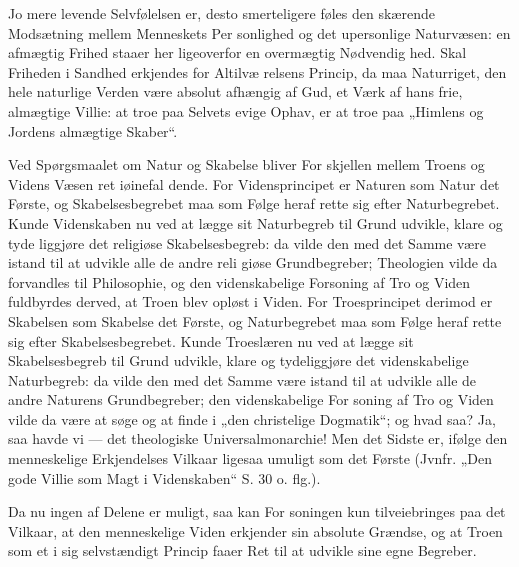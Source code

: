 \documentclass[12pt]{book}
\newcommand{\opage}[1]{\marginnote{\footnotesize\textit{[#1]}}}
\begin{document}
Jo mere levende Selvfølelsen er, desto smerteligere
føles den skærende Modsætning mellem Menneskets Per\-%
sonlighed og det upersonlige Naturvæsen: en afmægtig
Frihed staaer her ligeoverfor en overmægtig Nødvendig\-%
hed. Skal Friheden i Sandhed erkjendes for Altilvæ\-%
relsens Princip, da maa Naturriget, den hele naturlige
Verden være absolut afhængig af Gud, et Værk af hans
frie, almægtige Villie: at troe paa Selvets evige Ophav,
er at troe paa „Himlens og Jordens almægtige Skaber“.

Ved Spørgsmaalet om Natur og Skabelse bliver For\-%
skjellen mellem Troens og Videns Væsen ret iøinefal\-%
dende. For Vidensprincipet er Naturen som Natur det
Første, og Skabelsesbegrebet maa som Følge heraf rette
sig efter Naturbegrebet. Kunde Videnskaben nu ved at
lægge sit Naturbegreb til Grund udvikle, klare og tyde\-%
liggjøre det religiøse Skabelsesbegreb: da vilde den med
det Samme være istand til at udvikle alle de andre reli\-%
giøse Grundbegreber; Theologien vilde da forvandles til
Philosophie, og den videnskabelige Forsoning af Tro og
Viden fuldbyrdes derved, at Troen blev opløst i Viden.
For Troesprincipet derimod er Skabelsen som Skabelse
det Første, og Naturbegrebet maa som Følge heraf rette
sig efter Skabelsesbegrebet. Kunde Troeslæren nu ved
at lægge sit Skabelsesbegreb til Grund udvikle, klare og
tydeliggjøre det videnskabelige Naturbegreb: da vilde den
med det Samme være istand til at udvikle alle de andre
Naturens Grundbegreber; den videnskabelige For\-%
soning af Tro og Viden vilde da være at søge og at
finde i „den christelige Dogmatik“; og hvad saa?
\opage{143}\setcounter{footnote}{0}%
Ja, saa havde vi --- det theologiske Universalmonarchie!
Men det Sidste er, ifølge den menneskelige Erkjendelses
Vilkaar ligesaa umuligt som det Første (Jvnfr. „Den gode
Villie som Magt i Videnskaben“ S. 30 o. flg.).

Da nu ingen af Delene er muligt, saa kan For\-%
soningen kun tilveiebringes paa det Vilkaar, at den
menneskelige Viden erkjender sin absolute Grændse, og
at Troen som et i sig selvstændigt Princip faaer Ret til
at udvikle sine egne Begreber.
\end{document}
